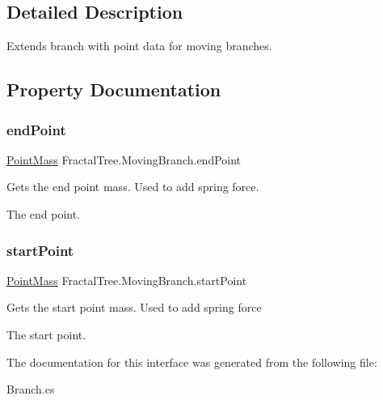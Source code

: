 \subsection{Detailed Description}
Extends branch with point data for moving branches. 



\subsection{Property Documentation}
\hypertarget{interface_fractal_tree_1_1_moving_branch_a232ab0d1d87bb5a0abc5c54d4f26fe2b}{}\label{interface_fractal_tree_1_1_moving_branch_a232ab0d1d87bb5a0abc5c54d4f26fe2b} 
\subsubsection{\texorpdfstring{end\+Point}{endPoint}}
{\footnotesize\ttfamily \hyperlink{class_fractal_tree_1_1_point_mass}{Point\+Mass} Fractal\+Tree.\+Moving\+Branch.\+end\+Point\hspace{0.3cm}{\ttfamily [get]}}



Gets the end point mass. Used to add spring force. 

The end point.\hypertarget{interface_fractal_tree_1_1_moving_branch_afbf74eadb94a987e4f845e77b8d0b964}{}\label{interface_fractal_tree_1_1_moving_branch_afbf74eadb94a987e4f845e77b8d0b964} 
\subsubsection{\texorpdfstring{start\+Point}{startPoint}}
{\footnotesize\ttfamily \hyperlink{class_fractal_tree_1_1_point_mass}{Point\+Mass} Fractal\+Tree.\+Moving\+Branch.\+start\+Point\hspace{0.3cm}{\ttfamily [get]}}



Gets the start point mass. Used to add spring force 

The start point.

The documentation for this interface was generated from the following file\+:\begin{DoxyCompactItemize}
\item 
Branch.\+cs\end{DoxyCompactItemize}
